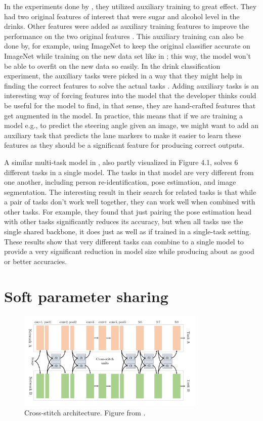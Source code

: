 In the experiments done by \citep{healthyDrink}, they utilized auxiliary training to great effect.
They had two original features of interest that were sugar and alcohol level in the drinks.
Other features were added as auxiliary training features to improve the performance on the two original features \citep{healthyDrink}.
This auxiliary training can also be done by, for example, using ImageNet to keep the original classifier accurate on ImageNet while training on the new data set like in \citep{biologicalMultitask}; this way, the model won't be able to overfit on the new data so easily.
In the drink classification experiment, the auxiliary tasks were picked in a way that they might help in finding the correct features to solve the actual tasks \citep{healthyDrink}.
Adding auxiliary tasks is an interesting way of forcing features into the model that the developer thinks could be useful for the model to find, in that sense, they are hand-crafted features that get augmented in the model.
In practice, this means that if we are training a model e.g., to predict the steering angle given an image, we might want to add an auxiliary task that predicts the lane markers to make it easier to learn these features as they should be a significant feature for producing correct outputs.

A similar multi-task model in \citep{visualPerson}, also partly visualized in Figure 4.1, solves 6 different tasks in a single model.
The tasks in that model are very different from one another, including person re-identification, pose estimation, and image segmentation.
The interesting result in their search for related tasks is that while a pair of tasks don't work well together, they can work well when combined with other tasks.
For example, they found that just pairing the pose estimation head with other tasks significantly reduces its accuracy, but when all tasks use the single shared backbone, it does just as well as if trained in a single-task setting.
These results show that very different tasks can combine to a single model to provide a very significant reduction in model size while producing about as good or better accuracies.

\section{Soft parameter sharing}

\begin{figure}[h!] 
\centering 
\includegraphics[width=0.8\textwidth]{imgs/stitch.png}
\caption{Cross-stitch architecture. Figure from \citep{crossStitch}.\label{fig:params}}
\end{figure}

